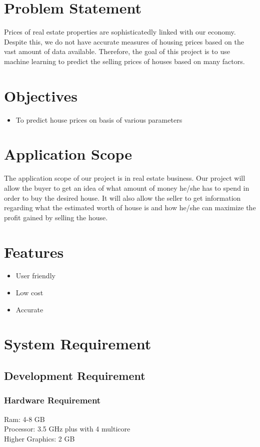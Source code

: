 \section{Problem Statement}\label{sec:prblm}
Prices of real estate properties are sophisticatedly linked with our economy. Despite this, we do not have accurate measures of housing prices based on the vast amount of data available. Therefore, the goal of this project is to use machine learning to predict the selling prices of houses based on many factors.
\section{Objectives}\label{sec:obj}
\begin{itemize}
\item To predict house prices on basis of various parameters
\end{itemize}
\section{Application Scope}\label{sec:asc}
The application scope of our project is in real estate business. Our project will allow the buyer to get an idea of what amount of money he/she has to spend in order to buy the desired house. It will also allow the seller to get information regarding what the estimated worth of house is and how he/she can maximize the profit gained by selling the house.
\section{Features}
\begin{itemize}
\item User friendly
\item Low cost
\item Accurate
\end{itemize}
\section{System Requirement}
\subsection{Development Requirement}
\subsubsection{Hardware Requirement}
Ram: 4-8 GB \\      
Processor: 3.5 GHz plus with 4 multicore\\
Higher Graphics: 2 GB
